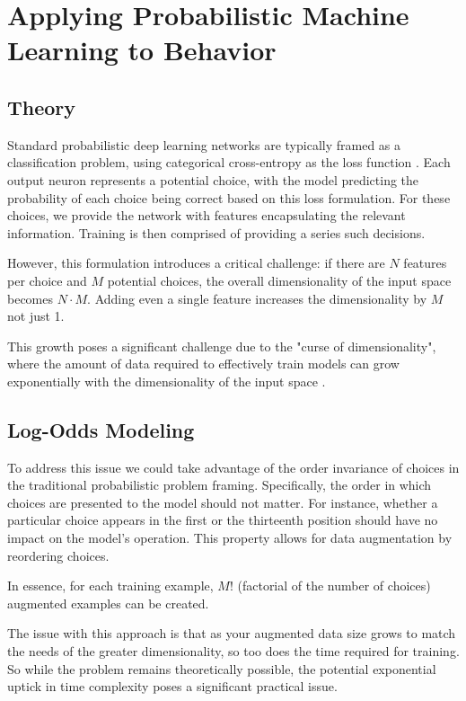 \documentclass[11pt]{article}
\begin{document}
\section*{Applying Probabilistic Machine Learning to Behavior}

\subsection*{Theory}

Standard probabilistic deep learning networks are typically framed as a classification problem, using categorical cross-entropy as the loss function \citep{durr}. Each output neuron represents a potential choice, with the model predicting the probability of each choice being correct based on this loss formulation. For these choices, we provide the network with features encapsulating the relevant information. Training is then comprised of providing a series such decisions. 

However, this formulation introduces a critical challenge: if there are $N$ features per choice and $M$ potential choices, the overall dimensionality of the input space becomes $N \cdot M$. Adding even a single feature increases the dimensionality by $M$ not just 1.

This growth poses a significant challenge due to the "curse of dimensionality", where the amount of data required to effectively train models can grow exponentially with the dimensionality of the input space \citep{curse}.

\subsection*{Log-Odds Modeling}

To address this issue we could take advantage of the order invariance of choices in the traditional probabilistic problem framing. Specifically, the order in which choices are presented to the model should not matter. For instance, whether a particular choice appears in the first or the thirteenth position should have no impact on the model's operation. This property allows for data augmentation by reordering choices.

In essence, for each training example, $M!$ (factorial of the number of choices) augmented examples can be created.

The issue with this approach is that as your augmented data size grows to match the needs of the greater dimensionality, so too does the time required for training. So while the problem remains theoretically possible, the potential exponential uptick in time complexity poses a significant practical issue. 
\end{document}
